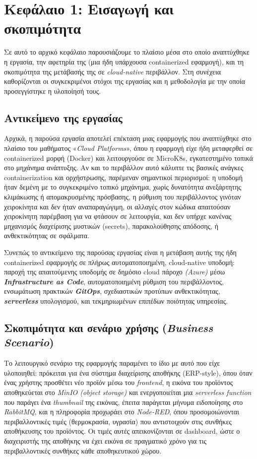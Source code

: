 \section{Κεφάλαιο 1: Εισαγωγή και σκοπιμότητα}

Σε αυτό το αρχικό κεφάλαιο παρουσιάζουμε το πλαίσιο μέσα στο οποίο αναπτύχθηκε η εργασία, την αφετηρία της (μια ήδη υπάρχουσα containerized εφαρμογή), και τη σκοπιμότητα της μετάβασής της σε \textit{cloud-native} περιβάλλον. Στη συνέχεια καθορίζονται οι συγκεκριμένοι στόχοι της εργασίας και η μεθοδολογία με την οποία προσεγγίστηκε η υλοποίησή τους.

\subsection{Αντικείμενο της εργασίας}

Αρχικά, η παρούσα εργασία αποτελεί επέκταση μιας εφαρμογής που αναπτύχθηκε στο πλαίσιο του μαθήματος «\textit{Cloud Platforms}», όπου η εφαρμογή είχε ήδη μεταφερθεί σε containerized μορφή (Docker) και λειτουργούσε σε MicroK8s, εγκατεστημένο τοπικά στο μηχάνημα ανάπτυξης. Αν και το περιβάλλον αυτό κάλυπτε τις βασικές ανάγκες containerization και ορχήστρωσης, παρέμεναν σημαντικοί περιορισμοί: η υποδομή ήταν δεμένη με το συγκεκριμένο τοπικό μηχάνημα, χωρίς δυνατότητα ανεξάρτητης κλιμάκωσης ή απομακρυσμένης πρόσβασης, η ρύθμιση του περιβάλλοντος γινόταν χειροκίνητα και δεν ήταν αναπαραγώγιμη, οι αλλαγές στον κώδικα απαιτούσαν χειροκίνητη παρέμβαση για να φτάσουν σε λειτουργία, και δεν υπήρχε κανένας μηχανισμός διαχείρισης μυστικών (secrets), παρακολούθησης απόδοσης, ή ανθεκτικότητας σε σφάλματα.

Συνεπώς το αντικείμενο της παρούσας εργασίας είναι η μετάβαση αυτής της ήδη containerized εφαρμογής σε πλήρως αυτοματοποιημένη, cloud-native υποδομή: παροχή της απαιτούμενης υποδομής σε δημόσιο cloud πάροχο \textit{(Azure)} μέσω \textbf{\textit{Infrastructure as Code}}, αυτοματοποιημένη ρύθμιση του περιβάλλοντος, ενσωμάτωση πρακτικών \textbf{\textit{GitOps}}, σχεδιαστικών προτύπων ανθεκτικότητας, \textbf{\textit{serverless}} υπολογισμού, και τεκμηριωμένων επιπέδων ποιότητας υπηρεσίας.

\subsection{Σκοπιμότητα και σενάριο χρήσης (\textit{Business Scenario})}

Το λειτουργικό σενάριο της εφαρμογής παραμένει το ίδιο με αυτό που είχε υλοποιηθεί: πρόκειται για ένα σύστημα διαχείρισης αποθήκης (ERP-style), όπου όταν ένας χρήστης προσθέτει νέο προϊόν μέσω του \textit{frontend}, η εικόνα του προϊόντος αποθηκεύεται στο \textit{MinIO (object storage)} και ενεργοποιείται μια \textit{serverless function} που παράγει ένα \textit{thumbnail} της εικόνας, έπειτα παράγεται μήνυμα ειδοποίησης στο \textit{RabbitMQ}, και η πληροφορία προχωράει στο \textit{Node-RED}, όπου προσομοιώνονται περιβαλλοντικές τιμές (θερμοκρασία, υγρασία) που αντιστοιχούν στις συνθήκες αποθήκευσης του προϊόντος. Οι τιμές αυτές απεικονίζονται σε dashboard, ώστε ο διαχειριστής της αποθήκης να έχει εικόνα σε πραγματικό χρόνο για τις περιβαλλοντικές συνθήκες κάθε αποθηκευτικού χώρου.

